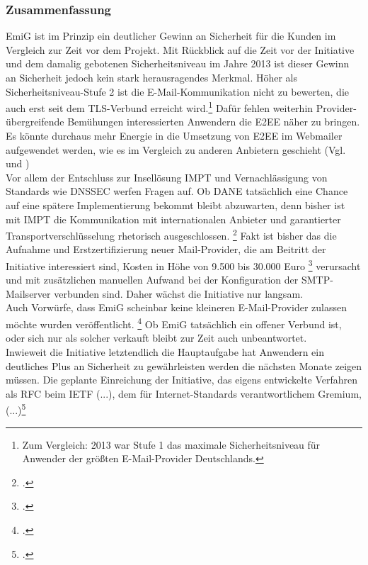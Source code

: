 \documentclass  [paper=a4,
				fontsize=12pt,
				listof=totoc,
				bibliography=totoc
				]{scrreprt}
\begin{document}
		\subsubsection{Zusammenfassung}
			EmiG ist im Prinzip ein deutlicher Gewinn an Sicherheit für die Kunden im Vergleich zur Zeit vor dem Projekt. 
			Mit Rückblick auf die Zeit vor der Initiative und dem damalig gebotenen Sicherheitsniveau im Jahre 2013 ist dieser Gewinn an Sicherheit jedoch kein stark herausragendes Merkmal.
			Höher als Sicherheitsniveau-Stufe 2 ist die E-Mail-Kommunikation nicht zu bewerten, die auch erst seit dem TLS-Verbund erreicht wird.\footnote{Zum Vergleich: 2013 war Stufe 1 das maximale Sicherheitsniveau für Anwender der größten E-Mail-Provider Deutschlands.}
			Dafür fehlen weiterhin Provider-übergreifende Bemühungen interessierten Anwendern die E2EE näher zu bringen.
			Es könnte durchaus mehr Energie in die Umsetzung von E2EE im Webmailer aufgewendet werden, wie es im Vergleich zu anderen Anbietern geschieht (Vgl.  und ) \medskip\\
			Vor allem der Entschluss zur Insellösung \ac{IMPT} und Vernachlässigung von Standards wie DNSSEC werfen Fragen auf. 
			Ob DANE tatsächlich eine Chance auf eine spätere Implementierung bekommt bleibt abzuwarten, denn bisher ist mit \ac{IMPT} die Kommunikation mit internationalen Anbieter und garantierter Transportverschlüsselung rhetorisch ausgeschlossen.
			\footcite[Vgl.][]{Zivadino14-1}
			Fakt ist bisher das die Aufnahme und Erstzertifizierung neuer Mail-Provider, die am Beitritt der Initiative interessiert sind, Kosten in Höhe von 9.500 bis 30.000 Euro
			\footcite[Vgl.][]{Zivadino14-3} 
			verursacht und mit zusätzlichen manuellen Aufwand bei der Konfiguration der SMTP-Mailserver verbunden sind.
			Daher wächst die Initiative nur langsam.\\
			Auch Vorwürfe, dass EmiG scheinbar keine kleineren E-Mail-Provider zulassen möchte wurden veröffentlicht.
			\footcite[Vgl.][]{Zivadino14-4}
			Ob EmiG tatsächlich ein offener Verbund ist, oder sich nur als solcher verkauft bleibt zur Zeit auch unbeantwortet. \medskip\\
			Inwieweit die Initiative letztendlich die Hauptaufgabe hat Anwendern ein deutliches Plus an Sicherheit zu gewährleisten werden die nächsten Monate zeigen müssen.
			Die geplante Einreichung der Initiative, das eigens entwickelte Verfahren als RFC beim IETF \glqq (...), dem für Internet-Standards verantwortlichem Gremium, (...)\grqq\footcite{Zivadino14-2}
\end{document}
